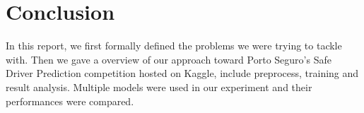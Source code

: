 \documentclass{standalone}
\begin{document}
\section{Conclusion}

In this report, we first formally defined the problems we were trying to tackle with. Then we gave a overview of our approach toward Porto Seguro's Safe Driver
Prediction competition hosted on Kaggle, include preprocess, training and
result analysis. Multiple models were used in our experiment and their
performances were compared.
\end{document}
